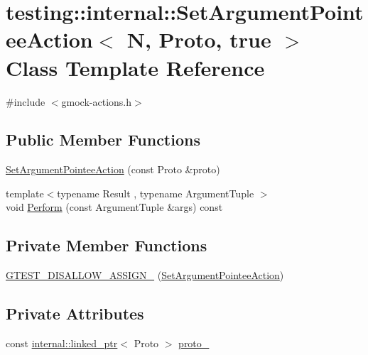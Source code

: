 \hypertarget{classtesting_1_1internal_1_1_set_argument_pointee_action_3_01_n_00_01_proto_00_01true_01_4}{}\section{testing\+::internal\+::Set\+Argument\+Pointee\+Action$<$ N, Proto, true $>$ Class Template Reference}
\label{classtesting_1_1internal_1_1_set_argument_pointee_action_3_01_n_00_01_proto_00_01true_01_4}


{\ttfamily \#include $<$gmock-\/actions.\+h$>$}

\subsection*{Public Member Functions}
\begin{DoxyCompactItemize}
\item 
\mbox{\hyperlink{classtesting_1_1internal_1_1_set_argument_pointee_action_3_01_n_00_01_proto_00_01true_01_4_af08b3a61e483f704e93872987d30ade0}{Set\+Argument\+Pointee\+Action}} (const Proto \&proto)
\item 
{\footnotesize template$<$typename Result , typename Argument\+Tuple $>$ }\\void \mbox{\hyperlink{classtesting_1_1internal_1_1_set_argument_pointee_action_3_01_n_00_01_proto_00_01true_01_4_ac89fa5dde5d2683206a77d29630917cd}{Perform}} (const Argument\+Tuple \&args) const
\end{DoxyCompactItemize}
\subsection*{Private Member Functions}
\begin{DoxyCompactItemize}
\item 
\mbox{\hyperlink{classtesting_1_1internal_1_1_set_argument_pointee_action_3_01_n_00_01_proto_00_01true_01_4_a936f6f5c944c2bd86251b7ef44387006}{G\+T\+E\+S\+T\+\_\+\+D\+I\+S\+A\+L\+L\+O\+W\+\_\+\+A\+S\+S\+I\+G\+N\+\_\+}} (\mbox{\hyperlink{structtesting_1_1internal_1_1_set_argument_pointee_action}{Set\+Argument\+Pointee\+Action}})
\end{DoxyCompactItemize}
\subsection*{Private Attributes}
\begin{DoxyCompactItemize}
\item 
const \mbox{\hyperlink{classtesting_1_1internal_1_1linked__ptr}{internal\+::linked\+\_\+ptr}}$<$ Proto $>$ \mbox{\hyperlink{classtesting_1_1internal_1_1_set_argument_pointee_action_3_01_n_00_01_proto_00_01true_01_4_aef9287aad8516bfec6cbcf63807c6c87}{proto\+\_\+}}
\end{DoxyCompactItemize}


